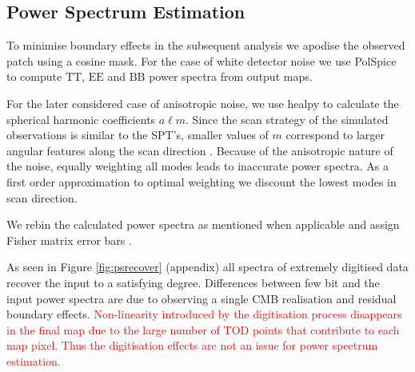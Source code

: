 \documentclass[apj]{emulateapj}
\newcommand{\changed}[1]{\textcolor{Red}{#1}}
\begin{document}




\subsection{Power Spectrum Estimation}
\label{subsec:psestimation}

To minimise boundary effects in the subsequent analysis we apodise the observed patch using a cosine mask. For the case of white detector noise we use PolSpice \citep{polspice} to compute $\mathrm{TT}$, $\mathrm{EE}$ and $\mathrm{BB}$ power spectra from output maps. 

For the later considered case of anisotropic noise, we use healpy to calculate the spherical harmonic coefficients $a\ell m$. Since the scan strategy of the simulated observations is similar to the SPT's, smaller values of $m$ correspond to larger angular features along the scan direction \citep{chown2018}. Because of the anisotropic nature of the noise, equally weighting all modes leads to inaccurate power spectra. As a first order approximation to optimal weighting we discount the lowest modes in scan direction.

We rebin the calculated power spectra as mentioned when applicable and assign Fisher matrix error bars \citep{tegmarkdesignersguide1997}.

As seen in Figure \ref{fig:psrecover} (appendix) all spectra of extremely digitised data recover the input to a satisfying degree. Differences between few bit and the input power spectra are due to observing a single CMB realisation and residual boundary effects. \changed{Non-linearity introduced by the digitisation process disappears in the final map due to the large number of TOD points that contribute to each map pixel. Thus the digitisation effects are not an issue for power spectrum estimation.}
\end{document}
